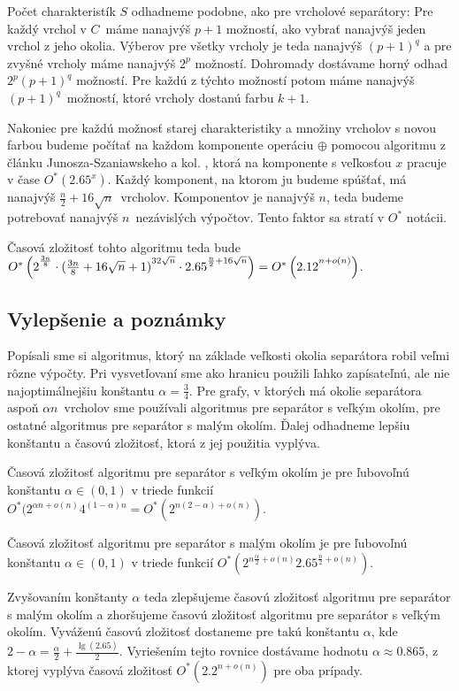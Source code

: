 Počet charakteristík $S$ odhadneme podobne, ako pre vrcholové separátory: Pre každý vrchol v $C$ máme
nanajvýš $p+1$ možností, ako vybrať nanajvýš jeden vrchol z jeho okolia. Výberov pre všetky vrcholy je
teda nanajvýš $(p+1)^q$ a pre zvyšné vrcholy máme nanajvýš $2^p$ možností. Dohromady dostávame horný
odhad $2^p (p+1)^q$ možností. Pre každú z týchto možností potom máme nanajvýš $(p+1)^q$ možností, ktoré
vrcholy dostanú farbu $k+1$.

Nakoniec pre každú možnosť starej charakteristiky a množiny vrcholov s novou farbou budeme počítať
na každom komponente operáciu $\oplus$ pomocou algoritmu z článku Junosza-Szaniawskeho a kol. \cite{junosza_fast},
ktorá na komponente s veľkosťou $x$ pracuje v čase $O^*(2.65^x)$. Každý komponent, na ktorom ju budeme
spúšťať, má nanajvýš $\frac{n}{2} + 16\sqrt{n}$ vrcholov. Komponentov je nanajvýš $n$, teda budeme
potrebovať nanajvýš $n$ nezávislých výpočtov. Tento faktor sa stratí v $O^*$ notácii.

Časová zložitosť tohto algoritmu teda bude $O^*\left(2\strut^{\frac{3n}{8}} \cdot (\frac{3n}{8} + 16 \sqrt{n} + 1)\strut^{32 \sqrt{n}} \cdot 2.65\strut^{\frac{n}{2} + 16 \sqrt{n}}\right) = O^*\left(2.12\strut^{n + o(n)}\right)$.

\subsection{Vylepšenie a poznámky}

Popísali sme si algoritmus, ktorý na základe veľkosti okolia separátora robil veľmi rôzne výpočty.
Pri vysvetľovaní sme ako hranicu použili ľahko zapísateľnú, ale nie najoptimálnejšiu konštantu
$\alpha = \frac{3}{4}$. Pre grafy, v ktorých má okolie separátora aspoň $\alpha n$ vrcholov
sme používali algoritmus pre separátor s veľkým okolím, pre ostatné algoritmus pre separátor
s malým okolím. Ďalej odhadneme lepšiu konštantu a časovú zložitosť, ktorá z jej použitia vyplýva.

Časová zložitosť algoritmu pre separátor s veľkým okolím je pre ľubovoľnú konštantu $\alpha \in (0, 1)$
v triede funkcií $O^*(2^{\alpha n + o(n)}4^{(1 - \alpha) n} = O^*(2^{n(2 - \alpha) + o(n)})$.

Časová zložitosť algoritmu pre separátor s malým okolím je pre ľubovoľnú konštantu $\alpha \in (0,1)$
v triede funkcií $O^*(2^{n\frac{\alpha}{2} + o(n)} 2.65^{\frac{n}{2} + o(n)})$.

Zvyšovaním konštanty $\alpha$ teda zlepšujeme časovú zložitosť algoritmu pre separátor s malým
okolím a zhoršujeme časovú zložitosť algoritmu pre separátor s veľkým okolím. Vyváženú časovú
zložitosť dostaneme pre takú konštantu $\alpha$, kde $2 - \alpha = \frac{\alpha}{2} + \frac{\lg(2.65)}{2}$.
Vyriešením tejto rovnice dostávame hodnotu $\alpha \approx 0.865$, z ktorej vyplýva časová zložitosť
$O^*(2.2^{n + o(n)})$ pre oba prípady.

